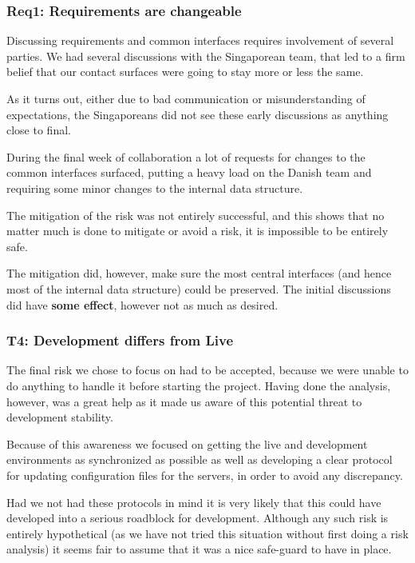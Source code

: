 \subsubsection{Req1: Requirements are changeable}

Discussing requirements and common interfaces requires involvement of several
parties. We had several discussions with the Singaporean team, that led to a
firm belief that our contact surfaces were going to stay more or less the same.

As it turns out, either due to bad communication or misunderstanding of
expectations, the Singaporeans did not see these early discussions as anything
close to final.

During the final week of collaboration a lot of requests for changes to the
common interfaces surfaced, putting a heavy load on the Danish team and
requiring some minor changes to the internal data structure.

The mitigation of the risk was not entirely successful, and this shows that no
matter much is done to mitigate or avoid a risk, it is impossible to be entirely
safe.

The mitigation did, however, make sure the most central interfaces (and hence
most of the internal data structure) could be preserved. The initial discussions
did have \textbf{some effect}, however not as much as desired.

\subsubsection{T4: Development differs from Live}

The final risk we chose to focus on had to be accepted, because we were unable to do
anything to handle it before starting the project. Having done the analysis, however, was a great help
as it made us aware of this potential threat to development stability.

Because of this awareness we focused on getting the live and development environments as synchronized as
possible as well as developing a clear protocol for updating configuration files for the servers, in
order to avoid any discrepancy.

Had we not had these protocols in mind it is very likely that this could have developed into a serious
roadblock for development. Although any such risk is entirely hypothetical (as we have not tried this
situation without first doing a risk analysis) it seems fair to assume that it was a nice safe-guard to
have in place.

